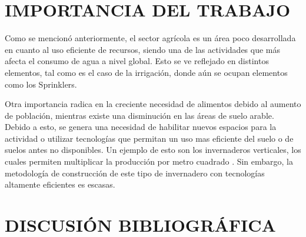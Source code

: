 \documentclass[12pt,a4paper]{article}
\begin{document}
	
	

\section{IMPORTANCIA DEL TRABAJO}


Como se mencionó anteriormente, el sector agrícola es un área poco desarrollada en cuanto al uso eficiente de recursos, siendo una de las actividades que más afecta el consumo de agua a nivel global. Esto se ve reflejado en distintos elementos, tal como es el caso de la irrigación, donde aún se ocupan elementos como los Sprinklers. 

Otra importancia radica en la creciente necesidad de alimentos debido al aumento de población, mientras existe una disminución en las áreas de suelo arable. Debido a esto, se genera una necesidad de habilitar nuevos espacios para la actividad o utilizar tecnologías que permitan un uso mas eficiente del suelo o de suelos antes no disponibles. Un ejemplo de esto son los invernaderos verticales, los cuales permiten multiplicar la producción por metro cuadrado \parencite{Specht2014}. Sin embargo, la metodología de construcción de este tipo de invernadero con tecnologías altamente eficientes es escasas.			
\section{DISCUSIÓN BIBLIOGRÁFICA}
\end{document}
